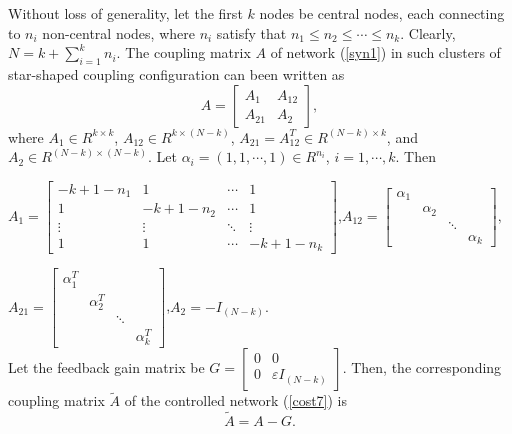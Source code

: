 \documentclass[11pt]{article}
\def\dref#1{(\ref{#1})}
\begin{document}
Without loss of generality, let the first $k$ nodes be central
nodes, each connecting to $n_i$ non-central nodes, where $n_i$
satisfy that $n_1\leq n_2\leq\cdots\leq n_k.$ Clearly,
$N=k+\sum_{i=1}^kn_i$. The coupling matrix $A$ of network
\dref{syn1} in such clusters of star-shaped coupling configuration
can been written as
\begin{equation} \label{cost6}
 A=\left[\begin{array}{cc}
 A_1  &  A_{12}  \\
 A_{21}  &  A_2
\end{array}\right],
\end{equation}
where $A_1\in R^{k\times k}$, $A_{12}\in R^{k\times(N-k)}$,
$A_{21}=A_{12}^T\in R^{(N-k)\times k}$, and $A_2\in
R^{(N-k)\times(N-k)}.$ Let $\alpha_i=(1,1,\cdots,1)\in
R^{n_i}$,\,\,$i=1,\cdots,k$. Then

$
 A_1=\left[\begin{array}{cccc}
 -k+1-n_1   &     1         & \cdots  & 1\\
     1      &  -k+1-n_2     & \cdots  & 1\\
  \vdots    &   \vdots      & \ddots  &\vdots\\
     1      &     1         & \cdots  &-k+1-n_k\end{array}\right]
$,\quad $
 A_{12}=\left[\begin{array}{cccc}
 \alpha_1 &           &          &        \\
          & \alpha_2  &          &        \\
          &           &  \ddots  &        \\
          &           &          & \alpha_k\end{array}\right],
$

$A_{21}=\left[\begin{array}{cccc}
 \alpha^T_1 &           &          &      \\
          & \alpha^T_2  &          &      \\
          &           &  \ddots  &     \\
          &           &          & \alpha^T_k\end{array}\right]
$,\quad $A_2=-I_{(N-k)}.$\\
Let the feedback gain matrix be
$
 G=\left[\begin{array}{cc}
 0  &  0  \\
 0  &  \varepsilon I_{(N-k)}
\end{array}\right].
$ Then, the corresponding coupling matrix $\tilde{A}$ of the
controlled network \dref{cost7} is
\begin{equation}\label{syn13}
\tilde{A}=A-G.
\end{equation}
\end{document}
